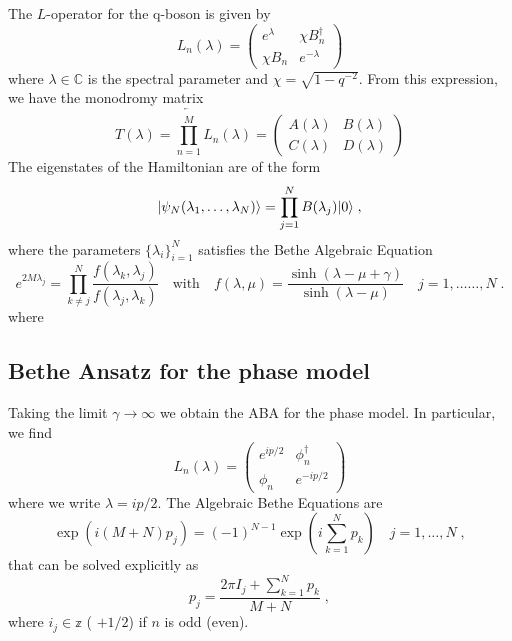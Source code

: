 \documentclass[a4paper,11pt]{amsart}
\begin{document}
The \(L\)-operator for the q-boson is given by
\begin{equation}
  L_n(\lambda) =
  \begin{pmatrix}
    e^\lambda & \chi B_n^\dagger \\ \chi B_n & e^{-\lambda}
  \end{pmatrix}
\end{equation}
where \(\lambda \in \mathbb{C}\) is the spectral parameter and \(\chi
= \sqrt{1 - q^{-2}}\). From this expression, we have the monodromy matrix
\begin{equation}
  T(\lambda) = \overleftarrow{\prod_{n = 1}^M} L_n(\lambda) =
  \begin{pmatrix}
    A(\lambda) & B(\lambda) \\ C(\lambda) & D(\lambda)
  \end{pmatrix}
\end{equation}
The eigenstates of the Hamiltonian are of the form
\begin{equation}
\lvert \psi_N(\lambda_1, \dots, \lambda_N)\rangle = \prod_{j=1}^N B(\lambda_j) \lvert0\rangle\; , 
\end{equation}
where the parameters \(\{\lambda_i\}_{i=1}^N\) satisfies the Bethe
Algebraic Equation
\begin{equation}
  e^{2M\lambda_j} = \prod_{k\neq j}^N \frac{f(\lambda_k, \lambda_j)}{f(\lambda_j, \lambda_k)}\quad \textrm{with} \quad
  f(\lambda, \mu) = \frac{\sinh(\lambda-\mu+\gamma)}{ \sinh(\lambda- \mu)}
  \quad j = 1,\dots \ldots , N\; .
\end{equation}
where 


\subsection{Bethe Ansatz for the phase model}

Taking the limit \(\gamma\to \infty\) we obtain the ABA for the phase model.
In particular, we find
\begin{equation}
  L_n(\lambda) =
  \begin{pmatrix}
    e^{ip/2} & \phi_n^\dagger \\ \phi_n & e^{-ip/2}
  \end{pmatrix}
\end{equation}
where we write \(\lambda = i p/2\). The Algebraic Bethe Equations are
\begin{equation}
\exp \left(i (M + N) p_j \right) = (-1)^{N-1} \exp \left( i \sum_{k=1}^N p_k \right)\quad j = 1, \dots, N\; ,
\end{equation}
that can be solved explicitly as
\begin{equation}
  \label{}
p_j = \frac{ 2 \pi I_j + \sum_{k=1}^N p_k}{M+N}\; , 
\end{equation}
where \(i_j \in \mathbb{z}\) ( \( + 1/2\)) if \(n\) is odd (even).
\end{document}
